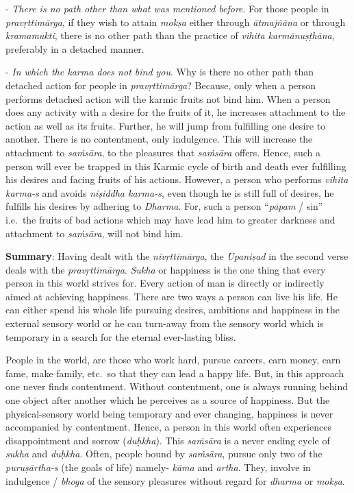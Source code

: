 - \emph{There is no path other than what was mentioned before}. For those people in \emph{pravṛttimārga}, if they wish to attain \emph{mokṣa} either through \emph{ātmajñāna} or through \emph{kramamukti}, there is no other path than the practice of \emph{vihita karmānuṣṭhāna}, preferably in a detached manner.

- \emph{In which the karma does not bind you}. Why is there no other path than detached action for people in \emph{pravṛttimārga}? Because, only when a person performs detached action will the karmic fruits not bind him. When a person does any activity with a desire for the fruits of it, he increases attachment to the action as well as its fruits. Further, he will jump from fulfilling one desire to another. There is no contentment, only indulgence. This will increase the attachment to \emph{saṁsāra}, to the pleasures that \emph{saṁsāra} offers. Hence, such a person will ever be trapped in this Karmic cycle of birth and death ever fulfilling his desires and facing fruits of his actions. However, a person who performs \emph{vihita karma-s} and avoids \emph{niṣiddha karma-s}, even though he is still full of desires, he fulfills his desires by adhering to \emph{Dharma}. For, such a person ``\emph{pāpam} / sin'' i.e.\ the fruits of bad actions which may have lead him to greater darkness and attachment to \emph{saṁsāra}, will not bind him.

\textbf{Summary}: Having dealt with the \emph{nivṛttimārga}, the \emph{Upaniṣad} in the second verse deals with the \emph{pravṛttimārga}. \emph{Sukha} or happiness is the one thing that every person in this world strives for. Every action of man is directly or indirectly aimed at achieving happiness. There are two ways a person can live his life. He can either spend his whole life pursuing desires, ambitions and happiness in the external sensory world or he can turn-away from the sensory world which is temporary in a search for the eternal ever-lasting bliss.

People in the world, are those who work hard, pursue careers, earn money, earn fame, make family, etc.\ so that they can lead a happy life. But, in this approach one never finds contentment. Without contentment, one is always running behind one object after another which he perceives as a source of happiness. But the physical-sensory world being temporary and ever changing, happiness is never accompanied by contentment. Hence, a person in this world often experiences disappointment and sorrow (\emph{duḥkha}). This \emph{saṁsāra} is a never ending cycle of \emph{sukha} and \emph{duḥkha}. Often, people bound by \emph{saṁsāra}, pursue only two of the \emph{puruṣārtha-s} (the goals of life) namely- \emph{kāma} and \emph{artha}. They, involve in indulgence / \emph{bhoga} of the sensory pleasures without regard for \emph{dharma} or \emph{mokṣa}.

